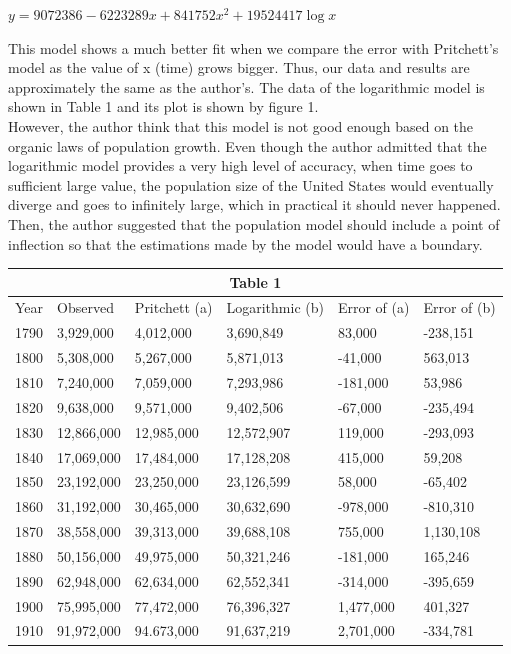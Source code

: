 \documentclass[a4paper]{article}
\begin{document}
\begin{center}

$y=9072386-6223289x+841752x^2+19524417 \log{x}$ \

\end{center}

This model shows a much better fit when we compare the error with Pritchett's model as the value of x (time) grows bigger. Thus, our data and results are approximately the same as the author's. The data of the logarithmic model is shown in Table 1 and its plot is shown by figure 1.  \\

However, the author think that this model is not good enough based on the organic laws of population growth. Even though the author admitted that the logarithmic model provides a very high level of accuracy, when time goes to sufficient large value, the population size of the United States would eventually diverge and goes to infinitely large, which in practical it should never happened. Then, the author suggested that the population model should include a point of inflection so that the estimations made by the model would have a boundary.\

\begin{center}
\begin{tabular}{ |p{1cm}|p{1.8cm}|p{1.8cm}|p{1.8cm}|p{1.8cm}|p{1.9cm}| }
 \hline
 \multicolumn{6}{|c|}{Table 1}\\
 \hline
 Year & Observed & Pritchett (a) & Logarithmic (b) & Error of (a) & Error of (b)\\
 \hline
 1790 & 3,929,000 & 4,012,000 & 3,690,849 & 83,000 & -238,151 \\
 1800 & 5,308,000 & 5,267,000 & 5,871,013 & -41,000 & 563,013 \\
 1810 & 7,240,000 & 7,059,000 & 7,293,986 & -181,000 & 53,986 \\
 1820 & 9,638,000 & 9,571,000 & 9,402,506 & -67,000 & -235,494 \\
 1830 & 12,866,000 & 12,985,000 & 12,572,907 & 119,000 & -293,093 \\
 1840 & 17,069,000 & 17,484,000 & 17,128,208 & 415,000 & 59,208 \\
 1850 & 23,192,000 & 23,250,000 & 23,126,599 & 58,000 & -65,402 \\
 1860 & 31,192,000 & 30,465,000 & 30,632,690 & -978,000 & -810,310 \\
 1870 & 38,558,000 & 39,313,000 & 39,688,108 & 755,000 & 1,130,108 \\
 1880 & 50,156,000 & 49,975,000 & 50,321,246 & -181,000 & 165,246 \\
 1890 & 62,948,000 & 62,634,000 & 62,552,341 & -314,000 & -395,659 \\
 1900 & 75,995,000 & 77,472,000 & 76,396,327 & 1,477,000 & 401,327 \\
 1910 & 91,972,000 & 94.673,000 & 91,637,219 & 2,701,000 & -334,781 \\
 \hline
\end{tabular}
\end{center}
\end{document}
